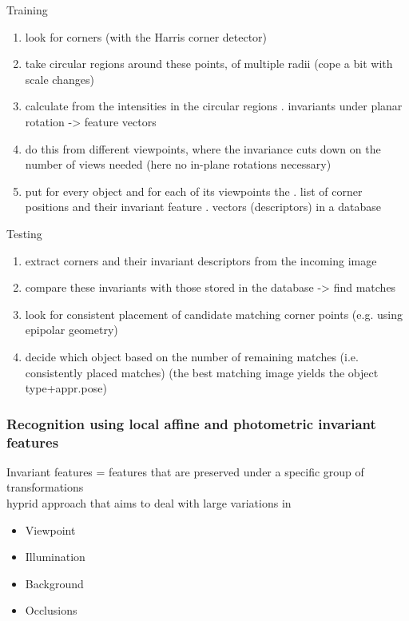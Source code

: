 Training
\begin{enumerate}
	\item look for corners (with the Harris corner detector)
	\item  take circular regions around these points, of multiple radii (cope a bit with scale changes)
	\item calculate from the intensities in the circular regions . invariants under planar rotation -> feature vectors
	\item do this from different viewpoints, where the invariance cuts down on the number of views needed (here no in-plane rotations necessary)
	\item put for every object and for each of its viewpoints the . list of corner positions and their invariant feature . vectors (descriptors) in a database
\end{enumerate}

Testing
\begin{enumerate}
	\item extract corners and their invariant descriptors from the incoming image
	\item compare these invariants with those stored in the database -> find matches
	\item look for consistent placement of candidate matching corner points (e.g. using epipolar geometry)
	\item decide which object based on the number of remaining matches (i.e. consistently placed matches) (the best matching image yields the object type+appr.pose)
\end{enumerate}

\subsubsection{Recognition using local affine and photometric invariant features}
Invariant features = features that are preserved under a specific group of transformations\\



hyprid approach that aims to deal with large variations in
\begin{itemize}
	\item Viewpoint
	\item Illumination
	\item Background
	\item Occlusions
\end{itemize}





